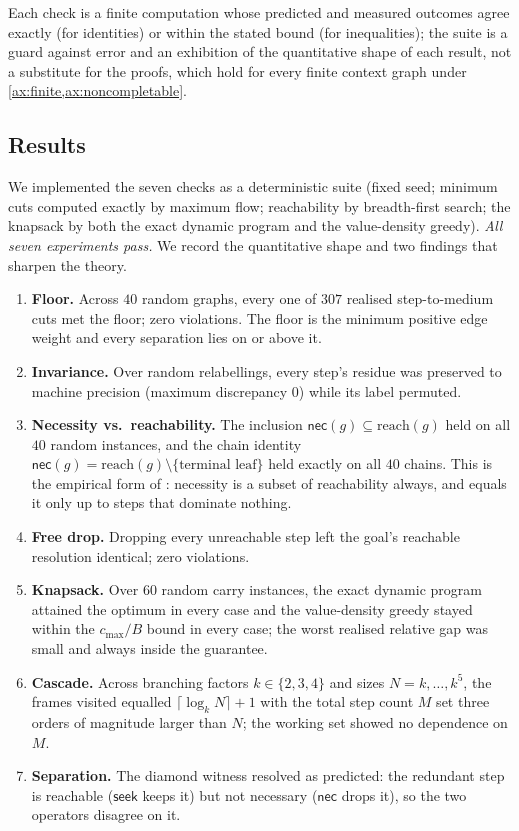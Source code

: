 \documentclass[11pt,twocolumn,a4paper]{article}
\theoremstyle{thmstyle}
\theoremstyle{definition}
\theoremstyle{remark}
\newcommand{\goal}{g}                   %
\newcommand{\reach}{\mathrm{reach}}
\newcommand{\budget}{B}
\newcommand{\seek}{\textsf{seek}}
\newcommand{\nec}{\textsf{nec}}
\newcommand{\cost}{c}                   %
\begin{document}
Each check is a finite computation whose predicted and measured outcomes agree
exactly (for identities) or within the stated bound (for inequalities); the
suite is a guard against error and an exhibition of the quantitative shape of
each result, not a substitute for the proofs, which hold for every finite context
graph under \cref{ax:finite,ax:noncompletable}.

\subsection{Results}
\label{sec:validation-results}

We implemented the seven checks as a deterministic suite (fixed seed; minimum
cuts computed exactly by maximum flow; reachability by breadth-first search; the
knapsack by both the exact dynamic program and the value-density greedy). \emph{All
seven experiments pass.} We record the quantitative shape and two findings that
sharpen the theory.

\begin{enumerate}[leftmargin=1.6em,itemsep=3pt]
\item \textbf{Floor.} Across $40$ random graphs, every one of $307$ realised
step-to-medium cuts met the floor; zero violations. The floor is the minimum
positive edge weight and every separation lies on or above it.
\item \textbf{Invariance.} Over random relabellings, every step's residue was
preserved to machine precision (maximum discrepancy $0$) while its label
permuted.
\item \textbf{Necessity vs.\ reachability.} The inclusion
$\nec(\goal)\subseteq\reach(\goal)$ held on all $40$ random instances, and the
chain identity $\nec(\goal)=\reach(\goal)\setminus\{\text{terminal leaf}\}$ held
exactly on all $40$ chains. This is the empirical form of
: necessity is a subset of reachability always, and
equals it only up to steps that dominate nothing.
\item \textbf{Free drop.} Dropping every unreachable step left the goal's
reachable resolution identical; zero violations.
\item \textbf{Knapsack.} Over $60$ random carry instances, the exact dynamic
program attained the optimum in every case and the value-density greedy stayed
within the $\cost_{\max}/\budget$ bound in every case; the worst realised
relative gap was small and always inside the guarantee.
\item \textbf{Cascade.} Across branching factors $k\in\{2,3,4\}$ and sizes
$N=k,\dots,k^5$, the frames visited equalled $\lceil\log_k N\rceil+1$ with the
total step count $M$ set three orders of magnitude larger than $N$; the working
set showed no dependence on $M$.
\item \textbf{Separation.} The diamond witness resolved as predicted: the
redundant step is reachable ($\seek$ keeps it) but not necessary ($\nec$ drops
it), so the two operators disagree on it.
\end{enumerate}
\end{document}

